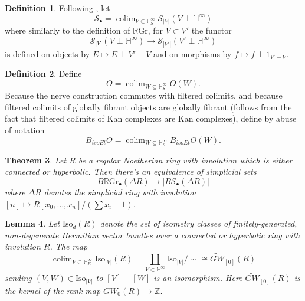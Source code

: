 \documentclass[edeposit,fullpage]{uiucthesis2009}
\newcommand{\Z}{\mathbb Z}
\newcommand{\mbb}{\mathbb}
\newcommand{\mc}{\mathcal}
\newcommand{\RGr}{\mathbb R\mathrm{Gr}}
\newcommand{\Iso}{\mathrm{Iso}}
\DeclareMathOperator*{\colim}{colim}
\theoremstyle{plain}
\newtheorem{lemma}{Lemma}
\numberwithin{lemma}{section}
\newtheorem{theorem}[lemma]{Theorem}
\theoremstyle{definition}
\newtheorem{definition}[lemma]{Definition}
\begin{document}
\begin{definition}
Following \cite{SchTri}, let
\[
\mc S_\bullet = \colim_{V \subset \mbb H^\infty_S} \mc S_{|V|}(V \perp
\mbb H^\infty)
\]
where similarly to the definition of $\RGr$, for $V \subset V'$ the
functor 
\[
\mc S_{|V|}(V \perp
\mbb H^\infty) \rightarrow \mc S_{|V'|}(V' \perp
\mbb H^\infty)
\]
is defined on objects by $E \mapsto E \perp V'-V$ and on morphisms by
$f \mapsto f \perp 1_{V'-V}$. 
\end{definition}

\begin{definition}
Define
\[
O = \colim_{W \subseteq \mbb H^\infty_S} O(W).
\]
Because the nerve construction commutes with filtered colimits, and
because filtered colimits of globally fibrant objects are globally
fibrant (follows from the fact that filtered colimits of Kan complexes
are Kan complexes), define by abuse of notation
\[
B_{isoEt}O = \colim_{W \subseteq \mbb H^\infty_S} B_{isoEt}O(W).
\]
\end{definition}

\begin{theorem}
Let $R$ be a regular Noetherian ring with involution which is either connected or
hyperbolic. Then there's an equivalence of simplicial sets
\[
B\RGr_\bullet(\Delta R) \rightarrow |B \mc S_\bullet (\Delta R)|
\]
where $\Delta R$ denotes the simplicial ring with involution $[n] \mapsto
R[x_0,\dots,x_n]/(\sum x_i -1)$. 
\end{theorem}


\begin{lemma}
Let $\Iso_d(R)$ denote the set of isometry classes of finitely-generated, non-degenerate
Hermitian vector bundles over a connected or hyperbolic ring with
involution $R$. The map
\[
\colim_{V \subset \mbb H^\infty_R} \Iso_{|V|}(R) = \coprod_{V \subset
  \mbb H^\infty} \Iso_{|V|}/\sim \cong \widetilde{GW}_{[0]}(R)
\]
sending $(V,W) \in \Iso_{|V|}$ to $[V] - [W]$ is an isomorphism. 
Here $\widetilde{GW}_{[0]}(R)$ is the kernel of the rank map $GW_0(R)
\rightarrow \Z$.
\end{lemma}
\end{document}
